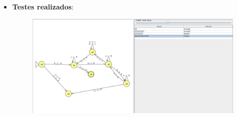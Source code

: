 \documentclass{article}
\begin{document}
\begin{itemize}
    \item \textbf{Testes realizados}:

        \begin{figure}[htbp]
            \centering
            \includegraphics[width=\textwidth]{images/questao1_inputs.png}
        \end{figure}

\end{itemize}

\newpage
\end{document}
